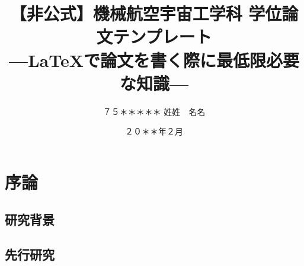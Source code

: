 \documentclass[
    openany,oneside,
    paper=a4paper,
    book,
    fontsize=12pt,
    jafontsize=12pt,
    head_space=30mm]{jlreq}
\begin{document}
\frontmatter



\title{【非公式】機械航空宇宙工学科 学位論文テンプレート\\ ---\LaTeX で論文を書く際に最低限必要な知識---}

\date{２０＊＊年２月}




\author{%
７５＊＊＊＊＊
\zw%
姓姓　名名
} %

\makecover

\pagestyle{empty}
\def\thepage{}
\tableofcontents

\signary

\lipsum[1-8]


\mainmatter
\newpage
\setcounter{page}{0}

\chapter{序論}
\label{ch:introduction}

\lipsum[1]

\section{研究背景}
\label{sec:background}

\lipsum[1-8]

\section{先行研究}
\label{sec:previous}
\end{document}
